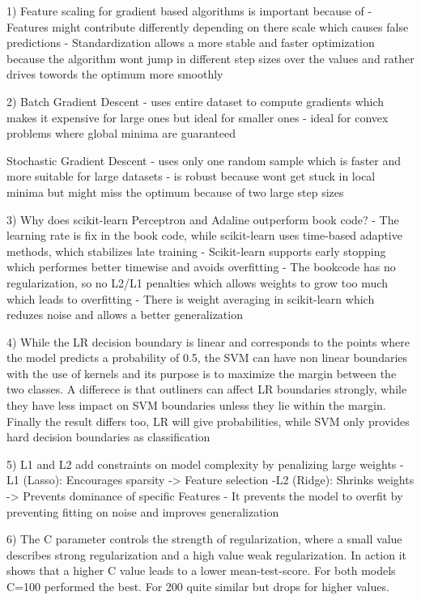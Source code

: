 1) Feature scaling for gradient based algorithms is important because of
    - Features might contribute differently depending on there scale which 
    causes false predictions
    - Standardization allows a more stable and faster optimization because 
    the algorithm wont jump in different step sizes over the values and 
    rather drives towords the optimum more smoothly

2) Batch Gradient Descent 
    - uses entire dataset to compute gradients which makes it expensive for large ones but 
    ideal for smaller ones
    - ideal for convex problems where global minima are guaranteed

    Stochastic Gradient Descent
    - uses only one random sample which is faster and more 
    suitable for large datasets
    - is robust because wont get stuck in local minima but 
    might miss the optimum because of two large step sizes

3) Why does scikit-learn Perceptron and Adaline outperform book code?
    - The learning rate is fix in the book code, while scikit-learn 
    uses time-based adaptive methods, which stabilizes late training
    - Scikit-learn supports early stopping which performes better 
    timewise and avoids overfitting
    - The bookcode has no regularization, so no L2/L1 penalties which 
    allows weights to grow too much which leads to overfitting
    - There is weight averaging in scikit-learn which reduzes noise 
    and allows a better generalization
    
4) While the LR decision boundary is linear and corresponds to the points 
    where the model predicts a probability of 0.5, the SVM can have non
    linear boundaries with the use of kernels and its purpose is to 
    maximize the margin between the two classes. 
    A differece is that outliners can affect LR boundaries strongly, while 
    they have less impact on SVM boundaries unless they lie within the margin.
    Finally the result differs too, LR will give probabilities, while 
    SVM only provides hard decision boundaries as classification

5) L1 and L2 add constraints on model complexity by penalizing large weights
        -L1 (Lasso): Encourages sparsity -> Feature selection
        -L2 (Ridge): Shrinks weights -> Prevents dominance of 
            specific Features
    - It prevents the model to overfit by preventing fitting on noise 
    and improves generalization

6) The C parameter controls the strength of regularization, where 
    a small value describes strong regularization and a high value weak 
    regularization. 
    In action it shows that a higher C value leads to a lower mean-test-score.
    For both models C=100 performed the best. For 200 quite similar but 
    drops for higher values.

